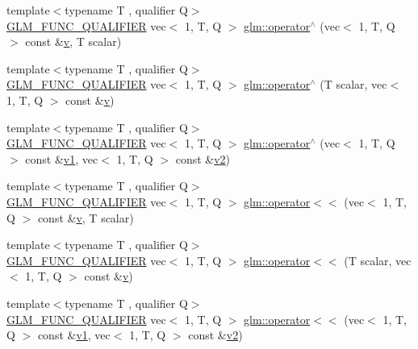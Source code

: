 \begin{DoxyCompactItemize}
{\footnotesize template$<$typename T , qualifier Q$>$ }\\\hyperlink{setup_8hpp_a33fdea6f91c5f834105f7415e2a64407}{G\+L\+M\+\_\+\+F\+U\+N\+C\+\_\+\+Q\+U\+A\+L\+I\+F\+I\+ER} vec$<$ 1, T, Q $>$ \hyperlink{group__ext__vec1_ga5e3dabaa97accd1e6cf3853326605d3e}{glm\+::operator$^\wedge$} (vec$<$ 1, T, Q $>$ const \&\hyperlink{_s_d_l__opengl_8h_a10a82eabcb59d2fcd74acee063775f90}{v}, T scalar)
\item 
{\footnotesize template$<$typename T , qualifier Q$>$ }\\\hyperlink{setup_8hpp_a33fdea6f91c5f834105f7415e2a64407}{G\+L\+M\+\_\+\+F\+U\+N\+C\+\_\+\+Q\+U\+A\+L\+I\+F\+I\+ER} vec$<$ 1, T, Q $>$ \hyperlink{group__ext__vec1_gad8d8f5ba70c15af0a21dc1f79c2101b9}{glm\+::operator$^\wedge$} (T scalar, vec$<$ 1, T, Q $>$ const \&\hyperlink{_s_d_l__opengl_8h_a10a82eabcb59d2fcd74acee063775f90}{v})
\item 
{\footnotesize template$<$typename T , qualifier Q$>$ }\\\hyperlink{setup_8hpp_a33fdea6f91c5f834105f7415e2a64407}{G\+L\+M\+\_\+\+F\+U\+N\+C\+\_\+\+Q\+U\+A\+L\+I\+F\+I\+ER} vec$<$ 1, T, Q $>$ \hyperlink{group__ext__vec1_gaf70fee42d06c335b281793ffc5864b3e}{glm\+::operator$^\wedge$} (vec$<$ 1, T, Q $>$ const \&\hyperlink{_s_d_l__opengl__glext_8h_a435c176a02c061b43e19bdf7c86cceae}{v1}, vec$<$ 1, T, Q $>$ const \&\hyperlink{_s_d_l__opengl__glext_8h_a0928f6d0f0f794ba000a21dfae422136}{v2})
\item 
{\footnotesize template$<$typename T , qualifier Q$>$ }\\\hyperlink{setup_8hpp_a33fdea6f91c5f834105f7415e2a64407}{G\+L\+M\+\_\+\+F\+U\+N\+C\+\_\+\+Q\+U\+A\+L\+I\+F\+I\+ER} vec$<$ 1, T, Q $>$ \hyperlink{group__ext__vec1_gad0e63491d035c65d38f24bd45d2e19d3}{glm\+::operator$<$$<$} (vec$<$ 1, T, Q $>$ const \&\hyperlink{_s_d_l__opengl_8h_a10a82eabcb59d2fcd74acee063775f90}{v}, T scalar)
\item 
{\footnotesize template$<$typename T , qualifier Q$>$ }\\\hyperlink{setup_8hpp_a33fdea6f91c5f834105f7415e2a64407}{G\+L\+M\+\_\+\+F\+U\+N\+C\+\_\+\+Q\+U\+A\+L\+I\+F\+I\+ER} vec$<$ 1, T, Q $>$ \hyperlink{group__ext__vec1_gad8117a2c6f59f08e76561309bcdffd1a}{glm\+::operator$<$$<$} (T scalar, vec$<$ 1, T, Q $>$ const \&\hyperlink{_s_d_l__opengl_8h_a10a82eabcb59d2fcd74acee063775f90}{v})
\item 
{\footnotesize template$<$typename T , qualifier Q$>$ }\\\hyperlink{setup_8hpp_a33fdea6f91c5f834105f7415e2a64407}{G\+L\+M\+\_\+\+F\+U\+N\+C\+\_\+\+Q\+U\+A\+L\+I\+F\+I\+ER} vec$<$ 1, T, Q $>$ \hyperlink{group__ext__vec1_gad8eac20444d6f266c9b23a6a05e75a5a}{glm\+::operator$<$$<$} (vec$<$ 1, T, Q $>$ const \&\hyperlink{_s_d_l__opengl__glext_8h_a435c176a02c061b43e19bdf7c86cceae}{v1}, vec$<$ 1, T, Q $>$ const \&\hyperlink{_s_d_l__opengl__glext_8h_a0928f6d0f0f794ba000a21dfae422136}{v2})

\end{DoxyCompactItemize}
